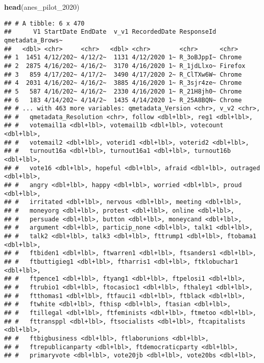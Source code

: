 \documentclass[
]{article}
\newenvironment{Shaded}{\begin{snugshade}}{\end{snugshade}}
\newcommand{\DecValTok}[1]{\textcolor[rgb]{0.00,0.00,0.81}{#1}}
\newcommand{\KeywordTok}[1]{\textcolor[rgb]{0.13,0.29,0.53}{\textbf{#1}}}
\newcommand{\NormalTok}[1]{#1}
\begin{document}
\begin{Shaded}
\begin{Highlighting}[]
\KeywordTok{head}\NormalTok{(anes_pilot_}\DecValTok{2020}\NormalTok{)}
\end{Highlighting}
\end{Shaded}

\begin{verbatim}
## # A tibble: 6 x 470
##      V1 StartDate EndDate  v_v1 RecordedDate ResponseId qmetadata_Brows~
##   <dbl> <chr>     <chr>   <dbl> <chr>        <chr>      <chr>           
## 1  1451 4/12/202~ 4/12/2~  1131 4/12/2020 1~ R_3oBJppI~ Chrome          
## 2  2875 4/16/202~ 4/16/2~  3170 4/16/2020 1~ R_1jdLlxo~ Firefox         
## 3   859 4/17/202~ 4/17/2~  3490 4/17/2020 2~ R_ClTXw6W~ Chrome          
## 4  2031 4/16/202~ 4/16/2~  3885 4/16/2020 1~ R_3sjr4ze~ Chrome          
## 5   587 4/16/202~ 4/16/2~  2330 4/16/2020 1~ R_21H8jh0~ Chrome          
## 6   183 4/14/202~ 4/14/2~  1435 4/14/2020 1~ R_25A8BQN~ Chrome          
## # ... with 463 more variables: qmetadata_Version <chr>, v_v2 <chr>,
## #   qmetadata_Resolution <chr>, follow <dbl+lbl>, reg1 <dbl+lbl>,
## #   votemail1a <dbl+lbl>, votemail1b <dbl+lbl>, votecount <dbl+lbl>,
## #   votemail2 <dbl+lbl>, voterid1 <dbl+lbl>, voterid2 <dbl+lbl>,
## #   turnout16a <dbl+lbl>, turnout16a1 <dbl+lbl>, turnout16b <dbl+lbl>,
## #   vote16 <dbl+lbl>, hopeful <dbl+lbl>, afraid <dbl+lbl>, outraged <dbl+lbl>,
## #   angry <dbl+lbl>, happy <dbl+lbl>, worried <dbl+lbl>, proud <dbl+lbl>,
## #   irritated <dbl+lbl>, nervous <dbl+lbl>, meeting <dbl+lbl>,
## #   moneyorg <dbl+lbl>, protest <dbl+lbl>, online <dbl+lbl>,
## #   persuade <dbl+lbl>, button <dbl+lbl>, moneycand <dbl+lbl>,
## #   argument <dbl+lbl>, particip_none <dbl+lbl>, talk1 <dbl+lbl>,
## #   talk2 <dbl+lbl>, talk3 <dbl+lbl>, fttrump1 <dbl+lbl>, ftobama1 <dbl+lbl>,
## #   ftbiden1 <dbl+lbl>, ftwarren1 <dbl+lbl>, ftsanders1 <dbl+lbl>,
## #   ftbuttigieg1 <dbl+lbl>, ftharris1 <dbl+lbl>, ftklobuchar1 <dbl+lbl>,
## #   ftpence1 <dbl+lbl>, ftyang1 <dbl+lbl>, ftpelosi1 <dbl+lbl>,
## #   ftrubio1 <dbl+lbl>, ftocasioc1 <dbl+lbl>, fthaley1 <dbl+lbl>,
## #   ftthomas1 <dbl+lbl>, ftfauci1 <dbl+lbl>, ftblack <dbl+lbl>,
## #   ftwhite <dbl+lbl>, fthisp <dbl+lbl>, ftasian <dbl+lbl>,
## #   ftillegal <dbl+lbl>, ftfeminists <dbl+lbl>, ftmetoo <dbl+lbl>,
## #   fttransppl <dbl+lbl>, ftsocialists <dbl+lbl>, ftcapitalists <dbl+lbl>,
## #   ftbigbusiness <dbl+lbl>, ftlaborunions <dbl+lbl>,
## #   ftrepublicanparty <dbl+lbl>, ftdemocraticparty <dbl+lbl>,
## #   primaryvote <dbl+lbl>, vote20jb <dbl+lbl>, vote20bs <dbl+lbl>,

\end{verbatim}
\end{document}

